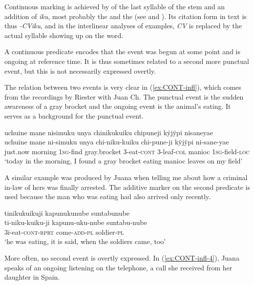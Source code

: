 Continuous marking is achieved by  of the last syllable of the stem and an addition of \textit{iku}, most probably the  and the  (see  and ). Its citation form in text is thus \textit{-CViku}, and in the interlinear analyses of examples, \textit{CV} is replaced by the actual syllable showing up on the word.

A continuous predicate encodes that the event was begun at some point and is ongoing at reference time. It is thus sometimes related to a second more punctual event, but this is not necessarily expressed overtly.

The relation between two events is very clear in (\ref{ex:CONT-infl}), which comes from the recordings by Riester with Juan Ch. The punctual event is the sudden awareness of a gray brocket and the ongoing event is the animal’s eating. It serves as a background for the punctual event.

\ea\label{ex:CONT-infl}
\begingl
\glpreamble uchuine mane nisimuku unya chinikukuiku chipuneji kÿjÿpi nisaneyae\\
\gla uchuine mane ni-simuku unya chi-niku-kuiku chi-pune-ji kÿjÿpi ni-sane-yae\\
\glb just.now morning 1\textsc{sg}-find gray.brocket 3-eat-\textsc{cont} 3-leaf-\textsc{col} manioc 1\textsc{sg}-field-\textsc{loc}\\
\glft ‘today in the morning, I found a gray brocket eating manioc leaves on my field’
\endgl
\trailingcitation{[nxx-a630101g-1.51]}
\xe

A similar example was produced by Juana when telling me about how a criminal in-law of hers was finally arrested. The additive marker on the second predicate is used because the man who was eating had also arrived only recently.

\ea\label{ex:CONT-infl-3}
\begingl
\glpreamble tinikukuikuji kapunukunube suntabunube\\
\gla ti-niku-kuiku-ji kapunu-uku-nube suntabu-nube\\
\glb 3i-eat-\textsc{cont}-\textsc{rprt} come-\textsc{add}-\textsc{pl} soldier-\textsc{pl}\\
\glft ‘he was eating, it is said, when the soldiers came, too’
\endgl
\trailingcitation{[jxx-p120430l-2.151]}
\xe

More often, no second event is overtly expressed. In (\ref{ex:CONT-infl-4}), Juana speaks of an ongoing listening on the telephone, a call she received from her daughter in Spain.

